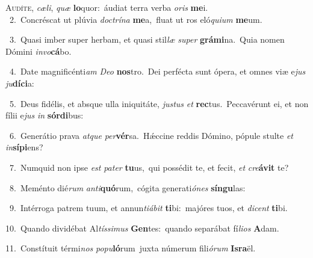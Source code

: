 \lettrine{\initial\textcolor{\initialcolor}{A}}{udíte,} \textit{cæ}\-\textit{li}, \textit{quæ} \textbf{lo}\-quor:~\star áudiat terra verba \textit{o}\-\textit{ris} \textbf{me}\-i.\\
{\numbfont\textcolor{\numbcolor}{~2.}}~Concréscat ut plúvia \textit{doc}\-\textit{trí}\textit{na} \textbf{me}\-a,~\star fluat ut ros eló\-\textit{qui}\-\textit{um} \textbf{me}\-um.\par
{\numbfont\textcolor{\numbcolor}{~3.}}~Quasi imber super herbam, et quasi stil\textit{læ} \textit{su}\-\textit{per} \textbf{grá}\-\textbf{mi}na.~\star Quia nomen Dómini \textit{in}\-\textit{vo}\textbf{cá}bo.\par
{\numbfont\textcolor{\numbcolor}{~4.}}~Date magnificénti\textit{am} \textit{De}\-\textit{o} \textbf{nos}\-tro.~\star Dei perfécta sunt ópera, et omnes viæ e\textit{jus} \textit{ju}\-\textbf{dí}\textbf{ci}a:\par
{\numbfont\textcolor{\numbcolor}{~5.}}~Deus fidélis, et absque ulla iniquitáte, \textit{jus}\-\textit{tus} \textit{et} \textbf{rec}\-tus.~\star Peccavérunt ei, et non fílii e\textit{jus} \textit{in} \textbf{sór}\-\textbf{di}bus:\par
{\numbfont\textcolor{\numbcolor}{~6.}}~Generátio prava \textit{at}\-\textit{que} \textit{per}\-\textbf{vér}sa.~\star Hǽccine reddis Dómino, pópule stulte \textit{et} \textit{in}\-\textbf{sí}\textbf{pi}ens?\par
{\numbfont\textcolor{\numbcolor}{~7.}}~Numquid non ipse \textit{est} \textit{pa}\-\textit{ter} \textbf{tu}\-us,~\star qui possédit te, et fecit, \textit{et} \textit{cre}\-\textbf{á}\textbf{vit} te?\par
{\numbfont\textcolor{\numbcolor}{~8.}}~Meménto dié\textit{rum} \textit{an}\-\textit{ti}\textbf{quó}rum,~\star cógita generati\-\textit{ó}\-\textit{nes} \textbf{sín}\-\textbf{gu}las:\par
{\numbfont\textcolor{\numbcolor}{~9.}}~Intérroga patrem tuum, et annun\-\textit{ti}\-\textit{á}\textit{bit} \textbf{ti}\-bi:~\star majóres tuos, et \textit{di}\-\textit{cent} \textbf{ti}\-bi.\par
{\numbfont\textcolor{\numbcolor}{10.}}~Quando dividébat Al\-\textit{tís}\-\textit{si}\textit{mus} \textbf{Gen}\-tes:~\star quando separábat fí\-\textit{li}\-\textit{os} \textbf{A}\-dam.\par
{\numbfont\textcolor{\numbcolor}{11.}}~Constítuit térmi\textit{nos} \textit{po}\-\textit{pu}\textbf{ló}rum~\star juxta númerum fili\-\textit{ó}\-\textit{rum} \textbf{Is}\-\textbf{ra}ël.\par
